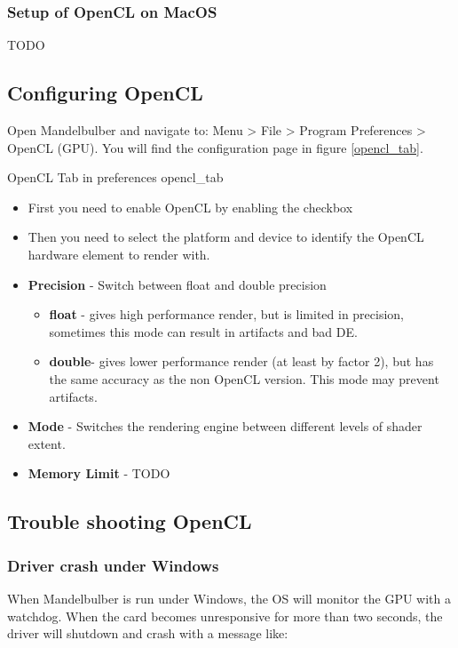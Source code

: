 \subsubsection{Setup of OpenCL on MacOS}\label{setup-opencl-macos}
TODO

\subsection{Configuring OpenCL}\label{configure-opencl}
Open Mandelbulber and navigate to: Menu > File > Program Preferences > OpenCL (GPU).
You will find the configuration page in figure \ref{opencl_tab}.

{OpenCL Tab in preferences}
{opencl_tab}

\begin{itemize}
	\item First you need to enable OpenCL by enabling the checkbox
	\item Then you need to select the platform and device to identify the OpenCL hardware 
		element to render with.
	\item \textbf{Precision} - Switch between float and double precision
	\begin{itemize}
		\item \textbf{float} - gives high performance render, but is limited in precision, 
			sometimes this mode can result in artifacts and bad DE.
		\item \textbf{double}- gives lower performance render (at least by factor 2), but has the same accuracy as the non OpenCL version. This mode may prevent artifacts.
	\end{itemize}
	\item \textbf{Mode} - Switches the rendering engine between different levels of shader extent.	
	\item \textbf{Memory Limit} - TODO
\end{itemize}

\subsection{Trouble shooting OpenCL}\label{opencl-troubleshooting}

\subsubsection{Driver crash under Windows}

When Mandelbulber is run under Windows, the OS will monitor the GPU with a watchdog. When the card becomes unresponsive for more than two seconds, the driver will shutdown and crash with a message like:

